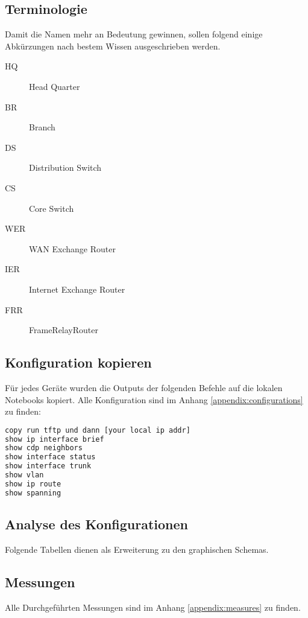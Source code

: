 \subsection{Terminologie}
Damit die Namen mehr an Bedeutung gewinnen, sollen folgend einige Abkürzungen nach bestem Wissen ausgeschrieben werden.
\begin{multicols}{2}
\begin{description}
	\item[HQ] Head Quarter
	\item[BR] Branch
	\item[DS] Distribution Switch
	\item[CS] Core Switch
	\item[WER] WAN Exchange Router
	\item[IER] Internet Exchange Router
	\item[FRR] FrameRelayRouter
\end{description}
\end{multicols}

\subsection{Konfiguration kopieren}
Für jedes Geräte wurden die Outputs der folgenden Befehle auf die lokalen Notebooks kopiert. Alle Konfiguration sind im Anhang \ref{appendix:configurations} zu finden:
\begin{lstlisting}[language=bash]
copy run tftp und dann [your local ip addr]
show ip interface brief
show cdp neighbors
show interface status
show interface trunk
show vlan
show ip route
show spanning
\end{lstlisting}

\subsection{Analyse des Konfigurationen}
Folgende Tabellen dienen als Erweiterung zu den graphischen Schemas.
\subsection{Messungen}
Alle Durchgeführten Messungen sind im Anhang \ref{appendix:measures} zu finden.

